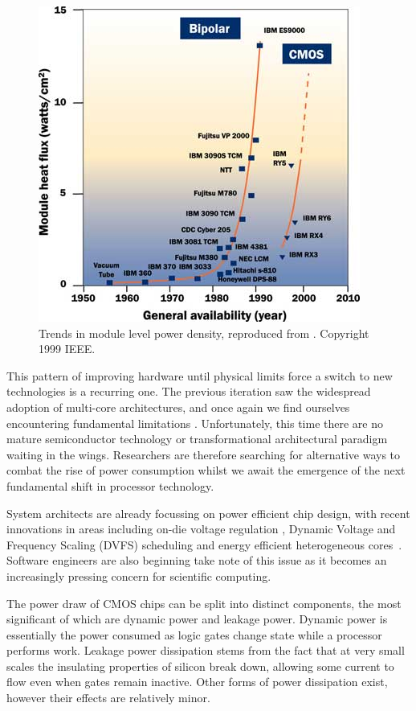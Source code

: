 \begin{figure}[ht]
\centering
\includegraphics[width=0.9\linewidth]{Images/bipolarcmos.jpg}
\caption{Trends in module level power density, reproduced from \cite{chu:1999aa}. Copyright 1999 IEEE.}
\end{figure}
This pattern of improving hardware until physical limits force a switch to new technologies is a recurring one. The previous iteration saw the widespread adoption of multi-core architectures, and once again we find ourselves encountering fundamental limitations \cite{esmaeilzadeh:2011aa}. Unfortunately,  this time there are no mature semiconductor technology or transformational architectural paradigm waiting in the wings. Researchers are therefore searching for alternative ways to combat the rise of power consumption whilst we await the emergence of the next fundamental shift in processor technology. \golden

System architects are already focussing on power efficient chip design, with recent innovations in areas including on-die voltage regulation \cite{burton:2014aa}, Dynamic Voltage and Frequency Scaling (DVFS) scheduling \cite{kwon:2013aa} and energy efficient heterogeneous cores~\cite{gupta:2012aa}. Software engineers are also beginning take note of this issue as it becomes an increasingly pressing concern for scientific computing. \golden

The power draw of CMOS chips can be split into distinct components, the most significant of which are dynamic power and leakage power. Dynamic power is essentially the power consumed as logic gates change state while a processor performs work. Leakage power dissipation stems from the fact that at very small scales the insulating properties of silicon break down, allowing some current to flow even when gates remain inactive. Other forms of power dissipation exist, however their effects are relatively minor. \golden

